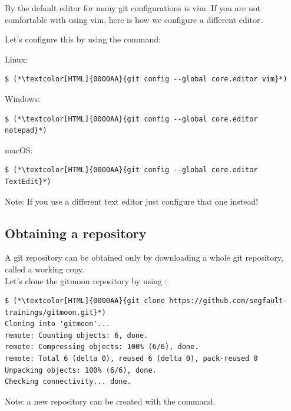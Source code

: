 \begin{frame}[fragile]
  \subslidetitle
  By the default editor for many git configurations is vim.
  If you are not comfortable with using vim, here is how we configure a different editor.

  \vspace{1em}
  Let's configure this by using the  command: \\
  \vspace{1em}

  Linux:
  \begin{lstlisting}
$ (*\textcolor[HTML]{0000AA}{git config --global core.editor vim}*)
\end{lstlisting}
  \vspace{1em}
  Windows:
  \begin{lstlisting}
$ (*\textcolor[HTML]{0000AA}{git config --global core.editor notepad}*)
\end{lstlisting}
  \vspace{1em}
  macOS:
  \begin{lstlisting}
$ (*\textcolor[HTML]{0000AA}{git config --global core.editor TextEdit}*)
\end{lstlisting}

  \vspace{1em}
  Note: If you use a different text editor just configure that one instead!

\end{frame}

\subsection{Obtaining a repository}
\begin{frame}[fragile]
  \subslidetitle
  A git repository can be obtained only by downloading a whole git repository,
  called a working copy.
  \\
  \vspace{1em}
  Let's clone the gitmoon repository by using :
  \begin{lstlisting}
$ (*\textcolor[HTML]{0000AA}{git clone https://github.com/segfault-trainings/gitmoon.git}*)
Cloning into 'gitmoon'...
remote: Counting objects: 6, done.
remote: Compressing objects: 100% (6/6), done.
remote: Total 6 (delta 0), reused 6 (delta 0), pack-reused 0
Unpacking objects: 100% (6/6), done.
Checking connectivity... done.
\end{lstlisting}

  \vspace{1em}
  Note: a new repository can be created with the  command.
\end{frame}

